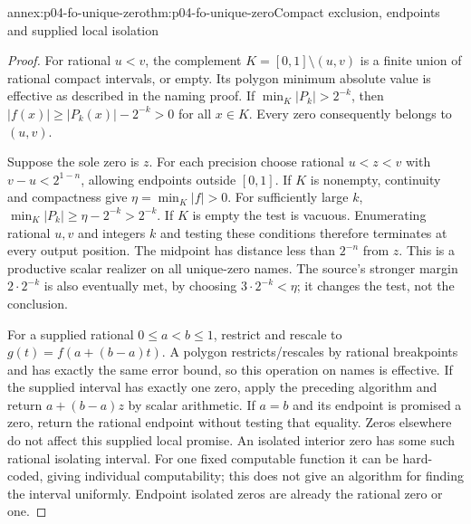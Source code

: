 \begin{annexitem}{annex:p04-fo-unique-zero}{thm:p04-fo-unique-zero}{Compact exclusion, endpoints and supplied local isolation}
\begin{proof}
For rational \(u<v\), the complement
\(K=[0,1]\setminus(u,v)\) is a finite union of rational
compact intervals, or empty.
Its polygon minimum absolute value is effective as described
in the naming proof. If \(\min_K|P_k|>2^{-k}\), then
\(|f(x)|\geq|P_k(x)|-2^{-k}>0\) for all \(x\in K\).
Every zero consequently belongs to \((u,v)\).

Suppose the sole zero is \(z\). For each precision choose
rational \(u<z<v\) with \(v-u<2^{1-n}\), allowing
endpoints outside \([0,1]\).
If \(K\) is nonempty, continuity and compactness give
\(\eta=\min_K|f|>0\). For sufficiently large \(k\),
\(\min_K|P_k|\geq\eta-2^{-k}>2^{-k}\).
If \(K\) is empty the test is vacuous.
Enumerating rational \(u,v\) and integers \(k\) and testing
these conditions therefore terminates at every output position.
The midpoint has distance less than \(2^{-n}\) from \(z\).
This is a productive scalar realizer on all unique-zero names.
The source's stronger margin \(2\cdot2^{-k}\) is also
eventually met, by choosing \(3\cdot2^{-k}<\eta\);
it changes the test, not the conclusion.

For a supplied rational \(0\leq a<b\leq1\), restrict and
rescale to \(g(t)=f(a+(b-a)t)\).
A polygon restricts/rescales by rational breakpoints and
has exactly the same error bound, so this operation on
names is effective. If the supplied interval has exactly
one zero, apply the preceding algorithm and return
\(a+(b-a)z\) by scalar arithmetic.
If \(a=b\) and its endpoint is promised a zero, return
the rational endpoint without testing that equality.
Zeros elsewhere do not affect this supplied local promise.
An isolated interior zero has some such rational isolating
interval. For one fixed computable function it can be
hard-coded, giving individual computability; this does not
give an algorithm for finding the interval uniformly.
Endpoint isolated zeros are already the rational zero or one.
\end{proof}
\end{annexitem}

